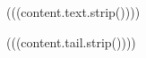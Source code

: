
\begin{Figure}
\centering
(((content.text.strip())))
\label{(((content.id)))}
\end{Figure}
(((content.tail.strip())))
